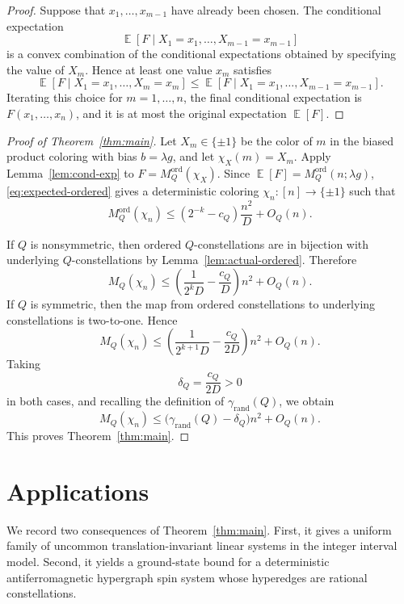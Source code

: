 \documentclass[twoside,12pt]{article}
\newcommand{\ord}{\mathrm{ord}}
\newcommand{\rand}{\mathrm{rand}}
\newcommand{\Mord}{M^{\ord}}
\DeclareMathOperator{\E}{\mathbb{E}}
\newcommand{\1}{\mathbf 1}
\begin{document}
\begin{proof}
Suppose that \(x_1,\dots,x_{m-1}\) have already been chosen.  The conditional
expectation
\[
\E\!\left[
F\mid X_1=x_1,\dots,X_{m-1}=x_{m-1}
\right]
\]
is a convex combination of the conditional expectations obtained by specifying
the value of \(X_m\).  Hence at least one value \(x_m\) satisfies
\[
\E\!\left[
F\mid X_1=x_1,\dots,X_m=x_m
\right]
\le
\E\!\left[
F\mid X_1=x_1,\dots,X_{m-1}=x_{m-1}
\right].
\]
Iterating this choice for \(m=1,\dots,n\), the final conditional expectation
is \(F(x_1,\dots,x_n)\), and it is at most the original expectation \(\E[F]\).
\end{proof}

\begin{proof}[Proof of Theorem~\ref{thm:main}]
Let \(X_m\in\{\pm1\}\) be the color of \(m\) in the biased product coloring
with bias \(b=\lambda g\), and let \(\chi_X(m)=X_m\).  Apply
Lemma~\ref{lem:cond-exp} to
$F=\Mord_Q(\chi_X)$.
Since \(\E[F]=\Mord_Q(n;\lambda g)\), \eqref{eq:expected-ordered} gives a
deterministic coloring \(\chi_n:[n]\to\{\pm1\}\) such that
\begin{equation}\label{eq:deterministic-ordered}
\Mord_Q(\chi_n)
\le
\left(2^{-k}-c_Q\right)\frac{n^2}{D}+O_Q(n).
\end{equation}

If \(Q\) is nonsymmetric, then ordered \(Q\)-constellations are in bijection
with underlying \(Q\)-constellations by Lemma~\ref{lem:actual-ordered}.
Therefore
\[
M_Q(\chi_n)
\le
\left(\frac{1}{2^kD}-\frac{c_Q}{D}\right)n^2+O_Q(n).
\]
If \(Q\) is symmetric, then the map from ordered constellations to underlying
constellations is two-to-one.  Hence
\[
M_Q(\chi_n)
\le
\left(\frac{1}{2^{k+1}D}-\frac{c_Q}{2D}\right)n^2+O_Q(n).
\]
Taking
\[
\delta_Q=\frac{c_Q}{2D}>0
\]
in both cases, and recalling the definition of \(\gamma_{\rand}(Q)\), we obtain
\[
M_Q(\chi_n)
\le
\bigl(\gamma_{\rand}(Q)-\delta_Q\bigr)n^2+O_Q(n).
\]
This proves Theorem~\ref{thm:main}.
\end{proof}

\section{Applications}
\label{sec:applications}

We record two consequences of Theorem~\ref{thm:main}.  First, it gives a
uniform family of uncommon translation-invariant linear systems in the integer
interval model.  Second, it yields a ground-state bound for a deterministic
antiferromagnetic hypergraph spin system whose hyperedges are rational
constellations.
\end{document}
